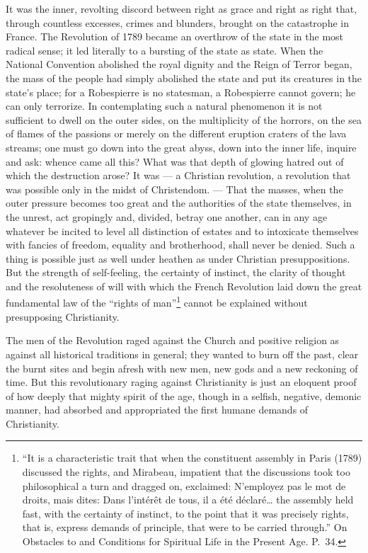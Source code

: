 \documentclass[12pt,a4paper,openany]{book}
\newcommand{\opage}[1]{\marginnote{\footnotesize\textit{[#1]}}}
\begin{document}
It was the inner, revolting discord between right
as grace and right as right that, through countless
excesses, crimes and blunders, brought on the catastrophe
in France. The Revolution of 1789 became an overthrow of the state
in the most radical sense; it led literally
to a bursting of the state as state. When the National Convention
abolished the royal dignity and the Reign of Terror
began, the mass of the people had simply
abolished the state and put its creatures in the state's place; for
a Robespierre is no statesman, a Robespierre cannot
govern; he can only terrorize. In contemplating
such a natural phenomenon it is not sufficient
to dwell on the outer sides, on the multiplicity of the horrors,
on the sea of flames of the passions or merely on the different
eruption craters of the lava streams; one must go down into the
great abyss, down into the inner life, inquire and ask: whence came
all this? What was that depth of glowing
hatred out of which the destruction arose? It was --- a Christian
revolution, a revolution that was possible only in the midst
\setcounter{footnote}{0}%
\opage{310}of Christendom. --- That the masses, when the outer pressure becomes
too great and the authorities of the state themselves, in the unrest, act
gropingly and, divided, betray one another, can in
any age whatever be incited to level all
distinction of estates and to intoxicate themselves with fancies of freedom,
equality and brotherhood, shall never be denied. Such a thing is possible
just as well under heathen as under Christian
presuppositions. But the strength of self-feeling, the certainty
of instinct, the clarity of thought and the resoluteness of will
with which the French Revolution laid down the great fundamental law of the ``rights of man''\footnote[1]{``It is a characteristic trait that when the constituent assembly in Paris (1789) discussed the rights, and Mirabeau, impatient that the discussions took too philosophical a turn and dragged on, exclaimed: N’employez pas le mot de droits, mais dites: Dans l’intérêt de tous, il a été déclaré\dots{} the assembly held fast, with the certainty of instinct, to the point that it was precisely rights, that is, express demands of principle, that were to be carried through.'' On Obstacles to and Conditions for Spiritual Life in the Present Age. P.~34.} cannot
be explained without presupposing Christianity.

The men of the Revolution raged against the Church and positive
religion as against all historical traditions in general;
they wanted to burn off the past, clear
the burnt sites and begin afresh with new men,
new gods and a new reckoning of time. But this revolutionary
raging against Christianity is just an eloquent proof
of how deeply that mighty spirit of the age, though in a
selfish, negative, demonic manner, had absorbed and appropriated
the first humane demands of Christianity.
\end{document}

